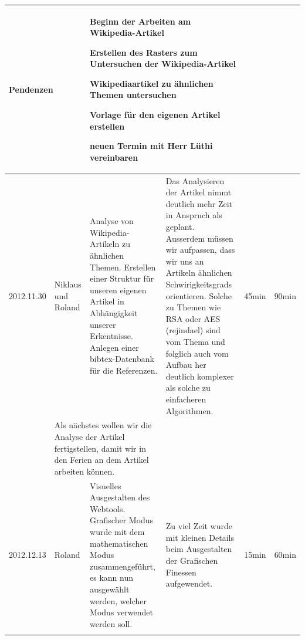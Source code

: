 \documentclass[11pt,paper=a4,final]{scrartcl}
\begin{document}
\begin{landscape}
\begin{longtable}{|p{1.8cm}|p{1.5cm}|p{5.0cm}|p{11.0cm}|l|l|}
    \multicolumn{2}{|l|}{\bf Pendenzen} &\multicolumn{2}{p{16.0cm}|}{
      \begin{itemize*}
        \item Beginn der Arbeiten am Wikipedia-Artikel
	\begin{itemize*}
	  \item Erstellen des Rasters zum Untersuchen der Wikipedia-Artikel
	  \item Wikipediaartikel zu \"ahnlichen Themen untersuchen
	  \item Vorlage f\"ur den eigenen Artikel erstellen
	 \end{itemize*}
	 \item neuen Termin mit Herr L\"uthi vereinbaren
      \end{itemize*}
    }  & \multicolumn{2}{l|}{} \\ \hline
    \hline
    2012.11.30 & Niklaus und Roland &
    Analyse von Wikipedia-Artikeln zu \"ahnlichen Themen. Erstellen einer
    Struktur f\"ur unseren eigenen Artikel in Abh\"angigkeit unserer
    Erkentnisse. Anlegen einer bibtex-Datenbank f\"ur die Referenzen.&
    Das Analysieren der Artikel nimmt deutlich mehr Zeit in Anspruch als
    geplant. Ausserdem m\"ussen wir aufpassen, dass wir uns an Artikeln
    \"ahnlichen Schwirigkeitsgrads orientieren. Solche zu Themen wie RSA oder
    AES (rejindael) sind vom Thema und folglich auch vom Aufbau her deutlich
    komplexer als solche zu einfacheren Algorithmen.
    &
    45min & 90min \\ \hline \nopagebreak
    \multicolumn{2}{|l|}{\bf Pendenzen} &\multicolumn{2}{p{16.0cm}|}{Als
    n\"achstes wollen wir die Analyse der Artikel fertigstellen, damit wir in
    den Ferien an dem Artikel arbeiten k\"onnen.
    }  & \multicolumn{2}{l|}{} \\ \hline
    \hline
    2012.12.13 & Roland &
    Visuelles Ausgestalten des Webtools. Grafischer Modus wurde mit dem
    mathematischen Modus zusammengef\"uhrt, es kann nun ausgew\"ahlt werden,
    welcher Modus verwendet werden soll.&
    Zu viel Zeit wurde mit kleinen Details beim Ausgestalten der Grafischen
    Finessen aufgewendet.
    &
    15min & 60min \\ \hline \nopagebreak
    \multicolumn{2}{|l|}{\bf Pendenzen} &\multicolumn{2}{p{16.0cm}|}{
}
\end{longtable}
\end{landscape}
\end{document}
